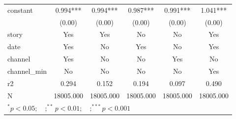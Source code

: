 \begin{tabular}{l*{5}{c}}
constant            &       0.994***&       0.994***&       0.987***&       0.991***&       1.041***\\
                    &      (0.00)   &      (0.00)   &      (0.00)   &      (0.00)   &      (0.00)   \\
\midrule
story               &         Yes   &         Yes   &          No   &          No   &         Yes   \\
date                &         Yes   &          No   &         Yes   &          No   &         Yes   \\
channel             &         Yes   &          No   &          No   &         Yes   &          No   \\
channel\_min         &          No   &          No   &          No   &          No   &         Yes   \\
r2                  &       0.294   &       0.152   &       0.194   &       0.097   &       0.490   \\
N                   &   18005.000   &   18005.000   &   18005.000   &   18005.000   &   18005.000   \\
\bottomrule
\multicolumn{6}{l}{\footnotesize $^{*}p<0.05; \quad ; ^{**} p<0.01; \quad ; ^{***}p<0.001$}\\
\end{tabular}
